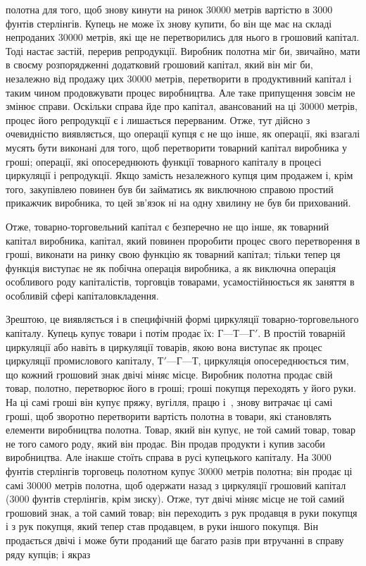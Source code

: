 \parcont{}  %
полотна для того, щоб знову кинути на ринок 30000 метрів вартістю в 3000 фунтів стерлінгів. Купець
не може їх знову купити, бо він ще має на складі непроданих 30000 метрів, які ще
не перетворились для нього в грошовий капітал. Тоді настає
застій, перерив репродукції. Виробник полотна міг би, звичайно,
мати в своєму розпорядженні додатковий грошовий капітал, який
він міг би, незалежно від продажу цих 30000 метрів, перетворити
в продуктивний капітал і таким чином продовжувати процес
виробництва. Але таке припущення зовсім не змінює справи.
Оскільки справа йде про капітал, авансований на ці 30000 метрів,
процес його репродукції є і лишається перерваним. Отже, тут
дійсно з очевидністю виявляється, що операції купця є не що
інше, як операції, які взагалі мусять бути виконані для того, щоб
перетворити товарний капітал виробника у гроші; операції, які
опосереднюють функції товарного капіталу в процесі циркуляції і репродукції. Якщо замість
незалежного купця цим продажем і, крім того, закупівлею повинен був би займатись як виключною
справою простий прикажчик виробника, то цей зв’язок ні
на одну хвилину не був би прихований.

Отже, товарно-торговельний капітал є безперечно не що
інше, як товарний капітал виробника, капітал, який повинен проробити процес свого перетворення в
гроші, виконати на ринку
свою функцію як товарний капітал; тільки тепер ця функція виступає не як побічна операція виробника,
а як виключна операція особливого роду капіталістів, торговців товарами, усамостійнюється як заняття
в особливій сфері капіталовкладення.

Зрештою, це виявляється і в специфічній формі циркуляції
товарно-торговельного капіталу. Купець купує товари і потім
продає їх: $Г — Т — Г'$. В простій товарній циркуляції або навіть
в циркуляції товарів, якою вона виступає як процес циркуляції
промислового капіталу, $Т' — Г — Т$, циркуляція опосереднюється
тим, що кожний грошовий знак двічі міняє місце. Виробник полотна продає свій товар, полотно,
перетворює його в гроші;
гроші покупця переходять у його руки. На ці самі гроші він
купує пряжу, вугілля, працю і~, знову витрачає ці самі
гроші, щоб зворотно перетворити вартість полотна в товари, які
становлять елементи виробництва полотна. Товар, який він купує, не той самий товар, товар не того
самого роду, який
він продає. Він продав продукти і купив засоби виробництва. Але
інакше стоїть справа в русі купецького капіталу. На 3000 фунтів стерлінгів торговець полотном купує
30000 метрів полотна;
він продає ці самі 30000 метрів полотна, щоб одержати назад
з циркуляції грошовий капітал (3000 фунтів стерлінгів, крім
зиску). Отже, тут двічі міняє місце не той самий грошовий знак,
а той самий товар; він переходить з рук продавця в руки покупця і з рук покупця, який тепер став
продавцем, в руки
іншого покупця. Він продається двічі і може бути проданий
ще багато разів при втручанні в справу ряду купців; і якраз
\parbreak{}  %
